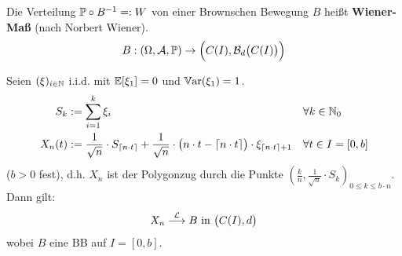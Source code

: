 Die Verteilung $\P\circ B^{-1}=:W$ von  einer Brownschen Bewegung $B$ heißt \textbf{Wiener-Maß} (nach Norbert Wiener).
\begin{align*}
B:(\Omega,\A,\P)\to\Big(C(I),\B_d\big(C(I)\big)\Big)
\end{align*}

\begin{satz}[Donsker]\label{satz7.16Donsker}%
Seien $(\xi)_{i\in\N}$ i.i.d. mit $\E[\xi_1]=0$ und $\Var(\xi_1)=1$.
\begin{align*}
S_k&:=\sum\limits_{i=1}^k\xi_i&\forall& k\in\N_0\\
X_n(t)&:=\frac{1}{\sqrt{n}}\cdot S_{\lceil n\cdot t\rceil}+\frac{1}{\sqrt{n}}\cdot\big(n\cdot t-\lceil n\cdot t\rceil\big)\cdot\xi_{\lceil n\cdot t\rceil+1} &\forall& t\in I=[0,b]
\end{align*}
($b>0$ fest), d.h. $X_n$ ist der Polygonzug durch die Punkte $\left(\frac{k}{n},\frac{1}{\sqrt{n}}\cdot S_k\right)_{0\leq k\leq b\cdot n}$. Dann gilt:
\begin{align*}
X_n\stackrel{\L}{\longrightarrow} B\text{ in }\big(C(I),d\big)
\end{align*}
wobei $B$ eine BB auf $I=[0,b]$.
\end{satz}

